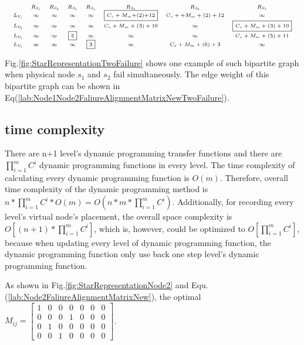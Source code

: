\begin{equation*}
\tiny{
 {\begin{array}{*{20}{c}}
&R_{S_1}&R_{S_2}&R_{S_3}&R_{S_4}&R_{S_5}&R_{S_6}&R_{S_{7}}\\
{L_{V_1}}&\infty&\infty&\infty&\infty&\fbox{$C_{s}+M_{m}$+(2)+12}&C_{s}++M_{m}+(2)+12&\infty\\
L_{V_2}&\infty&\infty&\infty&\infty&C_{s}+M_{m}+(3)+10&\infty&\fbox{$C_{s}+M_{m}+(3)+10$}\\
L_{V_3}&\infty&\infty&\fbox{5}&\infty&\infty&\infty&C_{s}+M_{m}+(5)+11\\
L_{V_4}&\infty&\infty&\infty&\fbox{3}&\infty&C_{s}+M_{m}+(6)+3&\infty\\
\end{array}}
}
\label{lab:Node1Node2FaliureAlignmentMatrixNewTwoFailure}
\end{equation*}


Fig.\ref{fig:StarRepresentationTwoFailure} shows one example of such  bipartite graph when physical node $s_1$ and $s_2$ fail simultaneously. The edge weight of this   bipartite graph can be shown in  Eq(\ref{lab:Node1Node2FaliureAlignmentMatrixNewTwoFailure}).


\subsection{time complexity}

There are n+1 level's dynamic programming  transfer functions and there are $\prod_{i=1}^{m}C^i$ dynamic programming functions in every level. The time complexity of calculating every dynamic programming function is $O(m)$. Therefore, overall time complexity of the dynamic programming method is $n*\prod_{i=1}^{m}C^i*O(m)=O(n*m*\prod_{i=1}^{m}C^i)$. Additionally, for recording every level's virtual node's placement, the overall space complexity is $O[(n+1)*\prod_{i=1}^{m}C^i]$, which is, however, could be optimized to $O[\prod_{i=1}^{m}C^i]$, because when updating every level of dynamic programming function, the dynamic programming function only use back one step level's dynamic programming function.


As shown in Fig.\ref{fig:StarRepresentationNode2} and Equ.(\ref{lab:Node2FaliureAlignmentMatrixNew}), the optimal $M_{ij}=\left[ {\begin{array}{*{20}{c}}
1&0&0&0&0&0&0\\
0&0&0&1&0&0&0\\
0&1&0&0&0&0&0\\
0&0&1&0&0&0&0
\end{array}} \right]$.
